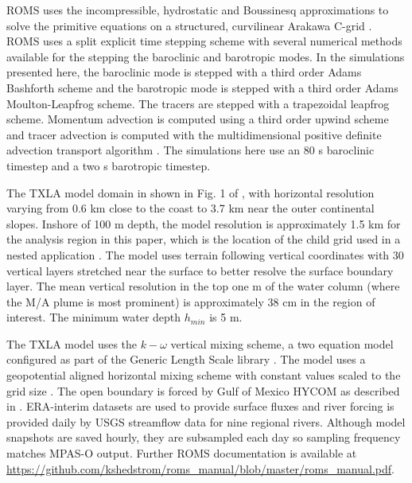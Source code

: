 ROMS uses the incompressible, hydrostatic and Boussinesq approximations to solve the primitive equations on a structured, curvilinear Arakawa C-grid \citep{Arakawa_1977, shchepetkin2005regional}. ROMS uses a split explicit time stepping scheme with several numerical methods available for the stepping the baroclinic and barotropic modes. In the simulations presented here, the baroclinic mode is stepped with a third order Adams Bashforth scheme and the barotropic mode is stepped with a third order Adams Moulton-Leapfrog scheme. The tracers are stepped with a trapezoidal leapfrog scheme. Momentum advection is computed using a third order upwind scheme and tracer advection is computed with the multidimensional positive definite advection transport algorithm \citep{Smolarkiewicz_1998}. The simulations here use an 80 s baroclinic timestep and a two s barotropic timestep. 

The TXLA model domain in shown in Fig. 1 of \cite{Schlichting23}, with horizontal resolution varying from 0.6 km close to the coast to 3.7 km near the outer continental slopes. Inshore of 100 m depth, the model resolution is approximately 1.5 km for the analysis region in this paper, which is the location of the child grid used in a nested application \citep{Schlichting23}. The model uses terrain following vertical coordinates with 30 vertical layers stretched near the surface to better resolve the surface boundary layer. The mean vertical resolution in the top one m of the water column (where the M/A plume is most prominent) is approximately 38 cm in the region of interest. The minimum water depth $h_{min}$ is 5 m. 

The TXLA model uses the $k-\omega$ vertical mixing scheme, a two equation model configured as part of the Generic Length Scale library \citep{umlauf2003extending, Warner_2005}. The model uses a geopotential aligned horizontal mixing scheme with constant values scaled to the grid size \citep[see Section 3.2 of ][]{Schlichting23}. The open boundary is forced by Gulf of Mexico HYCOM as described in \citep{Zhang_2012_forecast}. ERA-interim datasets are used to provide surface fluxes \citep{Dee_2011} and river forcing is provided daily by USGS streamflow data for nine regional rivers. Although model snapshots are saved hourly, they are subsampled each day so sampling frequency matches MPAS-O output. Further ROMS documentation is available at \url{https://github.com/kshedstrom/roms_manual/blob/master/roms_manual.pdf}.

